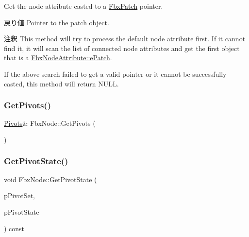 Get the node attribute casted to a \hyperlink{class_fbx_patch}{Fbx\+Patch} pointer. \begin{DoxyReturn}{戻り値}
Pointer to the patch object. 
\end{DoxyReturn}
\begin{DoxyRemark}{注釈}
This method will try to process the default node attribute first. If it cannot find it, it will scan the list of connected node attributes and get the first object that is a \hyperlink{class_fbx_node_attribute_a08e1669d3d1a696910756ab17de56d6aa22755745b03034d2d98691279f4b2adf}{Fbx\+Node\+Attribute\+::e\+Patch}. 

If the above search failed to get a valid pointer or it cannot be successfully casted, this method will return {\ttfamily N\+U\+LL}. 
\end{DoxyRemark}
\mbox{\label{class_fbx_node_a00f712842fd208697db1d7bac729b7ea}} 
\subsubsection{\texorpdfstring{Get\+Pivots()}{GetPivots()}}
{\footnotesize\ttfamily \hyperlink{class_fbx_node_1_1_pivots}{Pivots}\& Fbx\+Node\+::\+Get\+Pivots (\begin{DoxyParamCaption}{ }\end{DoxyParamCaption})}

\mbox{\label{class_fbx_node_a92c29d9151e6b490c27ca0831a52d566}} 
\subsubsection{\texorpdfstring{Get\+Pivot\+State()}{GetPivotState()}}
{\footnotesize\ttfamily void Fbx\+Node\+::\+Get\+Pivot\+State (\begin{DoxyParamCaption}\item[{\hyperlink{class_fbx_node_ae62b7311ac4727654cdf1ebd5cbf7343}{E\+Pivot\+Set}}]{p\+Pivot\+Set,  }\item[{\hyperlink{class_fbx_node_a153fc75958227fc6728a2233b630b58a}{E\+Pivot\+State} \&}]{p\+Pivot\+State }\end{DoxyParamCaption}) const}

